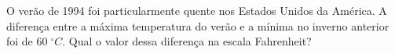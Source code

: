 %
%
    O verão de 1994 foi particularmente quente nos Estados Unidos da América. A diferença entre a máxima temperatura do verão e a mínima no inverno anterior foi de $60\;^\circ C$. Qual o valor dessa diferença na escala Fahrenheit?
